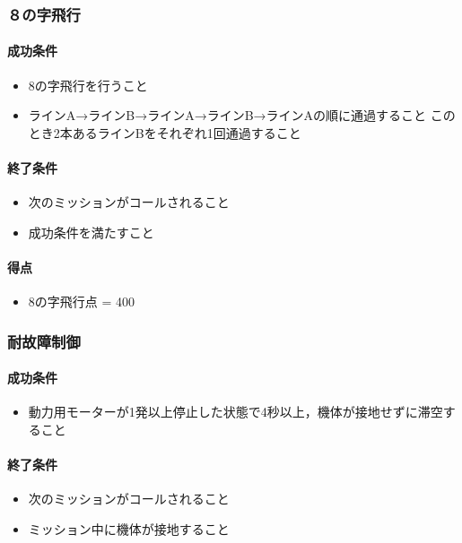 \subsubsection{８の字飛行}
\paragraph{成功条件}
\begin{itemize}
\item 8の字飛行を行うこと
\item ラインA→ラインB→ラインA→ラインB→ラインAの順に通過すること\newline
このとき2本あるラインBをそれぞれ1回通過すること
\end{itemize}
\paragraph{終了条件}
\begin{itemize}
\item 次のミッションがコールされること
\item 成功条件を満たすこと
\end{itemize}
\paragraph{得点}
\begin{itemize}
\item 8の字飛行点 = 400
\end{itemize}

\subsubsection{耐故障制御}
\paragraph{成功条件}
\begin{itemize}
  \item 動力用モーターが1発以上停止した状態で4秒以上，機体が接地せずに滞空すること
\end{itemize}
\paragraph{終了条件}
\begin{itemize}
  \item 次のミッションがコールされること
  \item ミッション中に機体が接地すること
\end{itemize}
